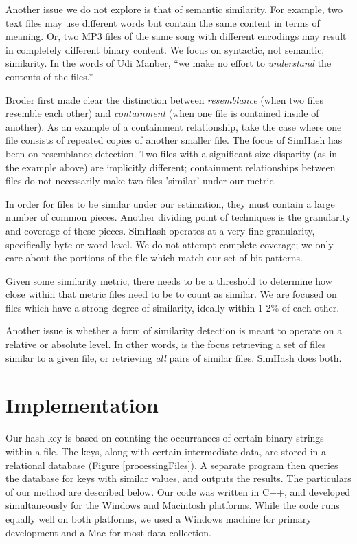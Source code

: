 \documentclass[10pt, twocolumn]{article}
\begin{document}
Another issue we do not explore is that of semantic similarity. For example, two text files may use different words but contain the same content in terms of meaning. Or, two MP3 files of the same song with different encodings may result in completely different binary content.  We focus on syntactic, not semantic, similarity. In the words of Udi Manber, ``we make no effort to \emph{understand} the contents of the files.'' \cite{manber}

Broder \cite{broder} first made clear the distinction between \emph{resemblance} (when two files resemble each other) and \emph{containment} (when one file is contained inside of another). As an example of a containment relationship, take the case where one file consists of repeated copies of another smaller file. The focus of SimHash has been on resemblance detection. Two files with a significant size disparity (as in the example above) are implicitly different; containment relationships between files do not necessarily make two files 'similar' under our metric.

In order for files to be similar under our estimation, they must contain a large number of common pieces. Another dividing point of techniques is the granularity and coverage of these pieces. SimHash operates at a very fine granularity, specifically byte or word level. We do not attempt complete coverage; we only care about the portions of the file which match our set of bit patterns.

Given some similarity metric, there needs to be a threshold to determine how close within that metric files need to be to count as similar. We are focused on files which have a strong degree of similarity, ideally within 1-2\% of each other.

Another issue is whether a form of similarity detection is meant to operate on a relative or absolute level. In other words, is the focus retrieving a set of files similar to a given file, or retrieving \emph{all} pairs of similar files. SimHash does both.


\section{Implementation}

Our hash key is based on counting the occurrances of certain binary strings within a file.  The keys, along with certain intermediate data, are stored in a relational database (Figure \ref{processingFiles}).  A separate program then queries the database for keys with similar values, and outputs the results.  The particulars of our method are described below.  Our code was written in C++, and developed simultaneously for the Windows and Macintosh platforms. While the code runs equally well on both platforms, we used a Windows machine for primary development and a Mac for most data collection.
\end{document}
